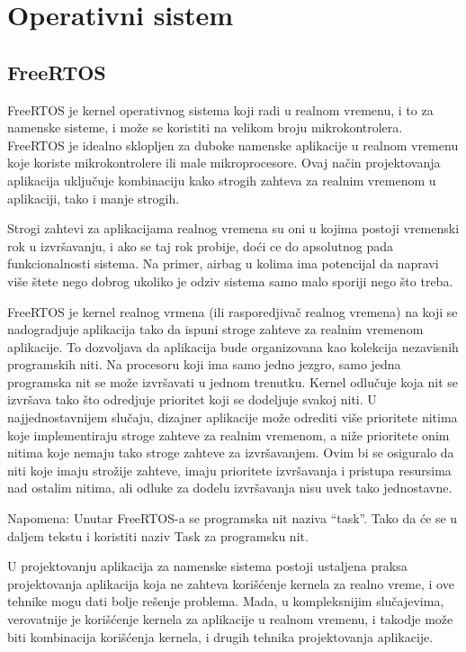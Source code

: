 \documentclass[a4paper,12pt, master]{etf}
\begin{document}
	\newpage

	\chapter{Operativni sistem}

	\section{FreeRTOS}

	FreeRTOS je kernel operativnog sistema koji radi u realnom vremenu, i to za
	namenske sisteme, i mo\v{z}e se koristiti na velikom broju mikrokontrolera.
	FreeRTOS je idealno sklopljen za duboke namenske aplikacije u realnom
	vremenu koje koriste mikrokontrolere ili male mikroprocesore. Ovaj
	na\v{c}in projektovanja aplikacija uklju\v{c}uje kombinaciju kako strogih
	zahteva za realnim vremenom u aplikaciji, tako i manje strogih.

	Strogi zahtevi za aplikacijama realnog vremena su oni u kojima postoji
	vremenski rok u	izvr\v{s}avanju, i ako se taj rok probije, do\'{c}i ce do
	apsolutnog pada funkcionalnosti sistema. Na primer, airbag u kolima ima
	potencijal da napravi vi\v{s}e \v{s}tete nego dobrog ukoliko je	odziv
	sistema samo malo sporiji nego \v{s}to treba.

	FreeRTOS je kernel realnog vrmena (ili rasporedjiva\v{c} realnog
	vremena) na	koji se nadogradjuje aplikacija tako da ispuni stroge zahteve
	za realnim vremenom aplikacije. To dozvoljava da aplikacija bude
	organizovana kao kolekcija nezavisnih programskih niti. Na procesoru koji
	ima samo jedno jezgro, samo jedna programska nit se mo\v{z}e izvr\v{s}avati
	u jednom trenutku. Kernel odlu\v{c}uje koja nit se izvr\v{s}ava tako
	\v{s}to odredjuje prioritet koji se dodeljuje svakoj niti. U
	najjednostavnijem slu\v{c}aju, dizajner aplikacije mo\v{z}e odrediti
	vi\v{s}e prioritete nitima koje implementiraju stroge zahteve za realnim
	vremenom, a ni\v{z}e prioritete onim nitima koje nemaju tako stroge zahteve
	za izvr\v{s}avanjem. Ovim bi se osiguralo da niti koje imaju stro\v{z}ije
	zahteve, imaju prioritete izvr\v{s}avanja i pristupa resursima nad ostalim
	nitima, ali odluke za dodelu izvr\v{s}avanja nisu uvek tako jednostavne.

	Napomena: Unutar FreeRTOS-a se programska nit naziva ``task''. Tako da
	\'{c}e se u daljem tekstu i koristiti naziv Task za programsku nit.

	U projektovanju aplikacija za namenske sistema postoji ustaljena praksa
	projektovanja aplikacija koja ne zahteva kori\v{s}\'{c}enje kernela za
	realno vreme, i ove tehnike mogu dati bolje re\v{s}enje problema. Mada, u
	kompleksnijim slu\v{c}ajevima, verovatnije je kori\v{s}\'{c}enje kernela za
	aplikacije u realnom vremenu, i takodje mo\v{z}e biti kombinacija
	kori\v{s}\'{c}enja kernela, i drugih tehnika projektovanja aplikacije.
\end{document}
